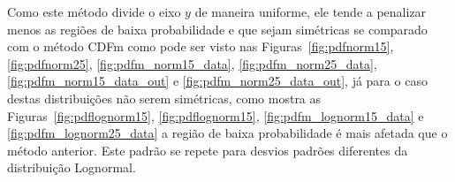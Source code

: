 Como este método divide o eixo $ y $ de maneira uniforme, ele tende a penalizar menos as regiões de baixa probabilidade e que sejam simétricas se comparado com o método \ac{CDFm} como pode ser visto nas Figuras~\ref{fig:pdfnorm15}, \ref{fig:pdfnorm25}, \ref{fig:pdfm_norm15_data}, \ref{fig:pdfm_norm25_data}, \ref{fig:pdfm_norm15_data_out} e \ref{fig:pdfm_norm25_data_out}, já para o caso destas distribuições não serem simétricas, como mostra as Figuras~\ref{fig:pdflognorm15}, \ref{fig:pdflognorm15}, \ref{fig:pdfm_lognorm15_data} e \ref{fig:pdfm_lognorm25_data} a região de baixa probabilidade é mais afetada que o método anterior. Este padrão se repete para desvios padrões diferentes da distribuição Lognormal.%

